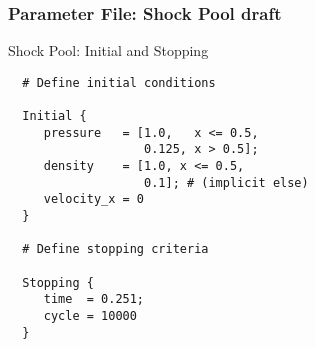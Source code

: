     \begin{frame}[fragile] \frametitle{Parameter File: Shock Pool draft}
 \footnotesize
\begin{block}{Shock Pool: Initial and Stopping}
      \begin{verbatim}
  # Define initial conditions
 
  Initial {
     pressure   = [1.0,   x <= 0.5,
                   0.125, x > 0.5];
     density    = [1.0, x <= 0.5,
                   0.1]; # (implicit else)
     velocity_x = 0
  }
 
  # Define stopping criteria
 
  Stopping {
     time  = 0.251;
     cycle = 10000
  }
      \end{verbatim}
\end{block}
\end{frame}
